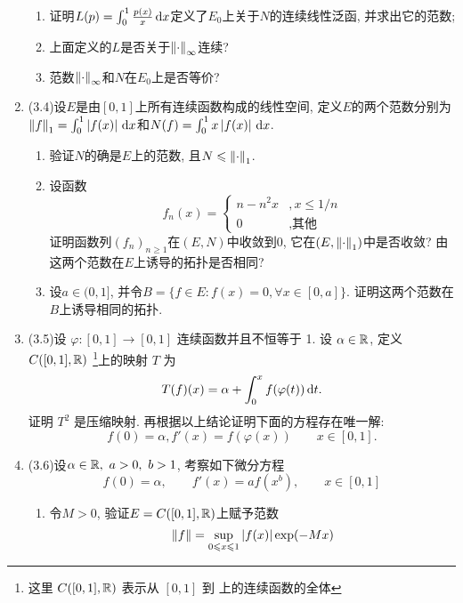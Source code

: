 \begin{enumerate}[label=\textbf{\arabic*.}, ref=\arabic*]
\begin{enumerate}[(1)]
        \item 证明$ L(p)=\int_0^1\frac{p(x)}{x}\,\mathrm{d} x $定义了$ E_0 $上关于$ N $的连续线性泛函, 并求出它的范数;
        \item 上面定义的$ L $是否关于$ \left\| \cdot \right\|_\infty $连续?
        \item 范数$ \left\| \cdot \right\|_\infty $和$ N $在$ E_0 $上是否等价?
        \end{enumerate}
    \item (3.4)设$ E $是由$ [0,1] $上所有连续函数构成的线性空间, 定义$ E $的两个范数分别为$ \left\| f \right\|_1=\int_0^1\left| f(x) \right| \,\mathrm{d} x $和$ N(f)=\int_0^1x\left| f(x) \right| \,\mathrm{d} x $.
        \begin{enumerate}[(1)]
        \item 验证$ N $的确是$ E $上的范数, 且$ N\leqslant\left\| \cdot \right\|_1 $.
        \item 设函数
        \[
        f_n(x)=\begin{cases}
        n-n^2x & ,x\leqslant 1/n\\
        0 & ,\text{其他}
        \end{cases}
        \]
        证明函数列$ (f_n)_{n\geqslant 1} $在$ (E,N) $中收敛到0, 它在$ (E,\left\| \cdot \right\|_1) $中是否收敛? 由这两个范数在$ E $上诱导的拓扑是否相同?
        \item 设$ a\in(0,1] $, 并令$ B=\{ f\in E : f(x)=0, \forall x\in[0,a] \} $. 证明这两个范数在$ B $上诱导相同的拓扑.
        \end{enumerate}
    \item (3.5)设 $ \varphi:[0, 1]\to [0, 1] $ 连续函数并且不恒等于 1. 设 $ \alpha\in\mathbb{R} $, 定义 $ C([0, 1],\mathbb{R}) $ \footnote{这里 $ C([0, 1],\mathbb{R}) $ 表示从 $ [0, 1] $ 到 \R 上的连续函数的全体 }上的映射 $ T $ 为
        \[
            T(f)(x)=\alpha+\int_{0}^{x}f(\varphi(t))\,\mathrm{d} t.
        \]
        证明 $ T^2 $ 是压缩映射. 再根据以上结论证明下面的方程存在唯一解:
        \begin{equation}
            f(0)=\alpha, f'(x)=f(\varphi(x))\qquad x\in[0, 1].
        \end{equation}
    \item (3.6)设$ \alpha\in\R,\ a>0,\ b>1 $, 考察如下微分方程
        \begin{equation}
        f(0)=\alpha,\qquad f'(x)=af(x^b),\qquad x\in[0,1]
        \end{equation}
        \begin{enumerate}[(1)]
        \item 令$ M>0 $, 验证$ E=C([0,1],\mathbb{R}) $上赋予范数
        \[
        \left\| f \right\|=\sup_{0\leqslant x\leqslant 1}\left| f(x) \right| \exp(-Mx)
\]
\end{enumerate}
\end{enumerate}
